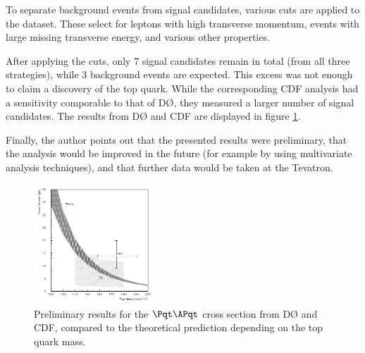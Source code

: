 To separate background events from signal candidates, various cuts are applied to the dataset.
These select for leptons with high transverse momentum, events with large missing transverse energy, and various other properties.

After applying the cuts, only 7 signal candidates remain in total (from all three strategies), while 3 background events are expected.
This excess was not enough to claim a discovery of the top quark.
While the corresponding CDF analysis had a sensitivity comporable to that of DØ, they measured a larger number of signal candidates\cite{cdf}.
The results from DØ and CDF are displayed in figure \ref{results}.

Finally, the author points out that the presented results were preliminary, that the analysis would be improved in the future (for example by using multivariate analysis techniques), and that further data would be taken at the Tevatron.

\begin{figure}
  \centering
  \includegraphics[width=0.4\textwidth]{figures/result.pdf}
  \caption{
    Preliminary results for the $\Pqt\APqt$ cross section from DØ and CDF, compared to the theoretical prediction depending on the top quark mass.
  }
  \label{results}
\end{figure}

\nocite{*}
\printbibliography


